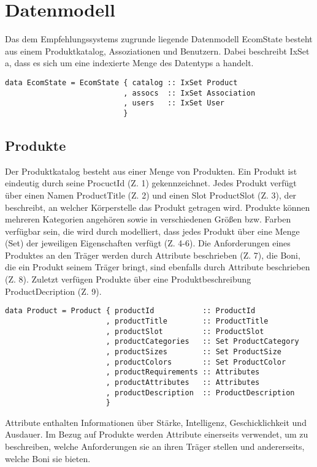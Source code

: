 \chapter{Datenmodell}
Das dem Empfehlungssystems zugrunde liegende Datenmodell \textsf{EcomState} besteht aus einem Produktkatalog, Assoziationen und Benutzern. Dabei beschreibt \textsf{IxSet a}, dass es sich um eine indexierte Menge des Datentyps \textsf{a} handelt.

\begin{lstlisting}[label=EcomState,caption=Struktur von \textsf{EcomState}]
data EcomState = EcomState { catalog :: IxSet Product
                           , assocs  :: IxSet Association
                           , users   :: IxSet User
                           }
\end{lstlisting}


\section{Produkte}
Der Produktkatalog besteht aus einer Menge von Produkten. Ein Produkt ist eindeutig durch seine \textsf{ProcuctId} (Z. 1) gekennzeichnet. Jedes Produkt verfügt über einen Namen \textsf{ProductTitle} (Z. 2) und einen Slot \textsf{ProductSlot} (Z. 3), der beschreibt, an welcher Körperstelle das Produkt getragen wird. Produkte können mehreren Kategorien angehören sowie in verschiedenen Größen bzw. Farben verfügbar sein, die wird durch modelliert, dass jedes Produkt über eine Menge (\textsf{Set}) der jeweiligen Eigenschaften verfügt (Z. 4-6). Die Anforderungen eines Produktes an den Träger werden durch Attribute beschrieben (Z. 7), die Boni, die ein Produkt seinem Träger bringt, sind ebenfalls durch Attribute beschrieben (Z. 8). Zuletzt verfügen Produkte über eine Produktbeschreibung \textsf{ProductDecription} (Z. 9).

\begin{lstlisting}[label=Product,caption=Struktur von \textsf{Product}]
data Product = Product { productId           :: ProductId
                       , productTitle        :: ProductTitle
                       , productSlot         :: ProductSlot
                       , productCategories   :: Set ProductCategory
                       , productSizes        :: Set ProductSize
                       , productColors       :: Set ProductColor
                       , productRequirements :: Attributes
                       , productAttributes   :: Attributes
                       , productDescription  :: ProductDescription
                       }
\end{lstlisting}
Attribute enthalten Informationen über Stärke, Intelligenz, Geschicklichkeit und Ausdauer. Im Bezug auf Produkte werden Attribute einerseits verwendet, um zu be\-schrei\-ben, welche Anforderungen sie an ihren Träger stellen und andererseits, welche Boni sie bie\-ten.

